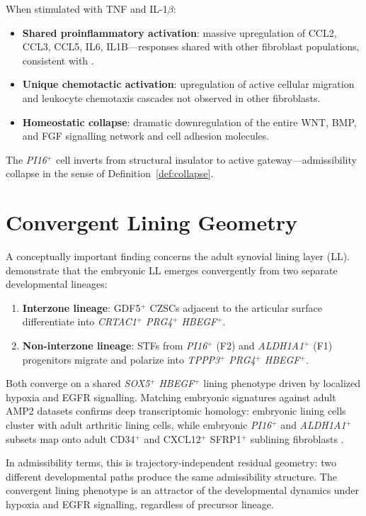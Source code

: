 \documentclass[12pt, a4paper, twoside]{book}
\theoremstyle{definition}
\theoremstyle{remark}
\newcommand{\gene}[1]{\textit{#1}}
\begin{document}
When stimulated with TNF and IL-1$\beta$:
\begin{itemize}
  \item \textbf{Shared proinflammatory activation}: massive upregulation of CCL2, CCL3, CCL5, IL6, IL1B---responses shared with other fibroblast populations, consistent with \citet{zhang2019}.
  \item \textbf{Unique chemotactic activation}: upregulation of active cellular migration and leukocyte chemotaxis cascades not observed in other fibroblasts.
  \item \textbf{Homeostatic collapse}: dramatic downregulation of the entire WNT, BMP, and FGF signalling network and cell adhesion molecules.
\end{itemize}

The \gene{PI16}$^+$ cell inverts from structural insulator to active gateway---admissibility collapse in the sense of Definition~\ref{def:collapse}.

\section{Convergent Lining Geometry}

A conceptually important finding concerns the adult synovial lining layer (LL). \citet{davidson2026} demonstrate that the embryonic LL emerges convergently from two separate developmental lineages:
\begin{enumerate}
  \item \textbf{Interzone lineage}: GDF5$^+$ CZSCs adjacent to the articular surface differentiate into \gene{CRTAC1}$^+$ \gene{PRG4}$^+$ \gene{HBEGF}$^+$.
  \item \textbf{Non-interzone lineage}: STFs from \gene{PI16}$^+$ (F2) and \gene{ALDH1A1}$^+$ (F1) progenitors migrate and polarize into \gene{TPPP3}$^+$ \gene{PRG4}$^+$ \gene{HBEGF}$^+$.
\end{enumerate}
Both converge on a shared \gene{SOX5}$^+$ \gene{HBEGF}$^+$ lining phenotype driven by localized hypoxia and EGFR signalling. Matching embryonic signatures against adult AMP2 datasets confirms deep transcriptomic homology: embryonic lining cells cluster with adult arthritic lining cells, while embryonic \gene{PI16}$^+$ and \gene{ALDH1A1}$^+$ subsets map onto adult CD34$^+$ and CXCL12$^+$ SFRP1$^+$ sublining fibroblasts \citep{davidson2026}.

In admissibility terms, this is trajectory-independent residual geometry: two different developmental paths produce the same admissibility structure. The convergent lining phenotype is an attractor of the developmental dynamics under hypoxia and EGFR signalling, regardless of precursor lineage.
\end{document}
